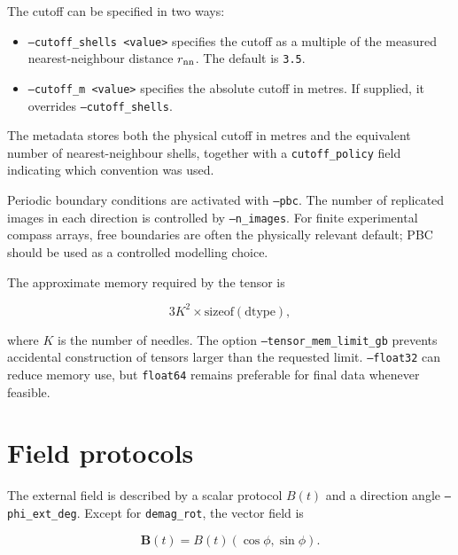 \documentclass[11pt,a4paper]{article}
\newcommand{\code}[1]{\texttt{#1}}
\newcommand{\vect}[1]{\boldsymbol{#1}}
\begin{document}
The cutoff can be specified in two ways:

\begin{itemize}[leftmargin=*]
    \item \code{--cutoff\_shells <value>} specifies the cutoff as a multiple of the measured nearest-neighbour distance $r_{\rm nn}$. The default is \code{3.5}.
    \item \code{--cutoff\_m <value>} specifies the absolute cutoff in metres. If supplied, it overrides \code{--cutoff\_shells}.
\end{itemize}

The metadata stores both the physical cutoff in metres and the equivalent number of nearest-neighbour shells, together with a \code{cutoff\_policy} field indicating which convention was used.

Periodic boundary conditions are activated with \code{--pbc}. The number of replicated images in each direction is controlled by \code{--n\_images}. For finite experimental compass arrays, free boundaries are often the physically relevant default; PBC should be used as a controlled modelling choice.

The approximate memory required by the tensor is

\begin{equation}
3K^2 \times \mathrm{sizeof(dtype)},
\end{equation}

where $K$ is the number of needles. The option \code{--tensor\_mem\_limit\_gb} prevents accidental construction of tensors larger than the requested limit. \code{--float32} can reduce memory use, but \code{float64} remains preferable for final data whenever feasible.

\section{Field protocols}
\label{sec:protocols}

The external field is described by a scalar protocol $B(t)$ and a direction angle \code{--phi\_ext\_deg}. Except for \code{demag\_rot}, the vector field is

\begin{equation}
\vect B(t)=B(t)(\cos\phi,\sin\phi).
\end{equation}
\end{document}

